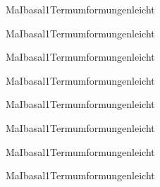 \documentclass[12pt]{article}
\begin{document}
\begin{Add}{MaI}{basal1}{Termumformungen}{leicht}
\end{Add}

\begin{Add}{MaI}{basal1}{Termumformungen}{leicht}
\end{Add}

\begin{Add}{MaI}{basal1}{Termumformungen}{leicht}
\end{Add}

\begin{Add}{MaI}{basal1}{Termumformungen}{leicht}
\end{Add}

\begin{Add}{MaI}{basal1}{Termumformungen}{leicht}
\end{Add}

\begin{Add}{MaI}{basal1}{Termumformungen}{leicht}
\end{Add}

\begin{Add}{MaI}{basal1}{Termumformungen}{leicht}
\end{Add}

\begin{Add}{MaI}{basal1}{Termumformungen}{leicht}
\end{Add}
\end{document}
